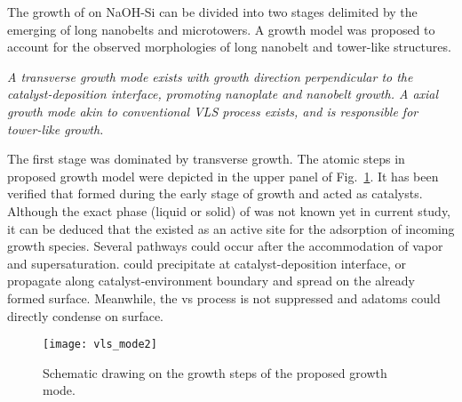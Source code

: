 The growth of  on NaOH-Si can be divided into two stages delimited by the emerging of long nanobelts and microtowers. A growth model was proposed to account for the observed morphologies of  long nanobelt and tower-like structures.
 
\emph{
A transverse growth mode exists with growth direction perpendicular to the catalyst-deposition interface, promoting  nanoplate and nanobelt growth. A axial growth mode akin to conventional VLS process exists, and is responsible for  tower-like growth.
}

The first stage was dominated by transverse growth. The atomic steps in proposed growth model were depicted in the upper panel of Fig.~\ref{fig:ch4vls}. It has been verified that  formed during the early stage of growth and acted as catalysts. Although the exact phase (liquid or solid) of  was not known yet in current study, it can be deduced that the  existed as an active site for the adsorption of incoming  growth species. Several pathways could occur after the accommodation of  vapor and supersaturation.  could precipitate at catalyst-deposition interface, or propagate along catalyst-environment boundary and spread on the already formed  surface. Meanwhile, the \gls{vs} process is not suppressed and  adatoms could directly condense on  surface.
\begin{figure}[htb]
\centering
\texttt{[image: vls\_mode2]}
\caption[Schematic drawing on the growth steps of the proposed growth mode]{Schematic drawing on the growth steps of the proposed growth mode.}
\label{fig:ch4vls}
\end{figure}
